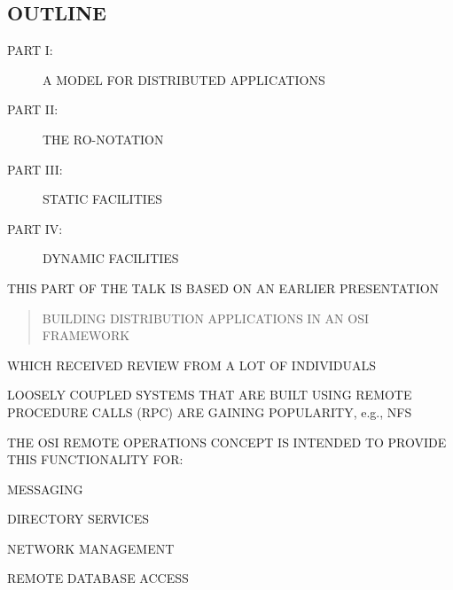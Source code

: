 


\begin{bwslide}
\part*	{OUTLINE}\bf

\begin{description}
\item[PART I:]		A MODEL FOR DISTRIBUTED APPLICATIONS

\item[PART II:]		THE RO-NOTATION

\item[PART III:]	STATIC FACILITIES

\item[PART IV:]		DYNAMIC FACILITIES
\end{description}
\end{bwslide}


\begin{bwslide}

\begin{nrtc}
\item	THIS PART OF THE TALK IS BASED ON AN EARLIER PRESENTATION
\begin{quote}
BUILDING DISTRIBUTION APPLICATIONS IN AN OSI FRAMEWORK
\end{quote}

\item	WHICH RECEIVED REVIEW FROM A LOT OF INDIVIDUALS
\end{nrtc}
\end{bwslide}


\begin{bwslide}

\begin{nrtc}
\item	LOOSELY COUPLED SYSTEMS THAT ARE BUILT USING REMOTE PROCEDURE CALLS
	(RPC) ARE GAINING POPULARITY, e.g., NFS

\item	THE OSI REMOTE OPERATIONS CONCEPT IS INTENDED TO PROVIDE THIS
	FUNCTIONALITY FOR:
    \begin{nrtc}
    \item	MESSAGING

    \item	DIRECTORY SERVICES

    \item	NETWORK MANAGEMENT

    \item	REMOTE DATABASE ACCESS
    \end{nrtc}
\end{nrtc}
\end{bwslide}


